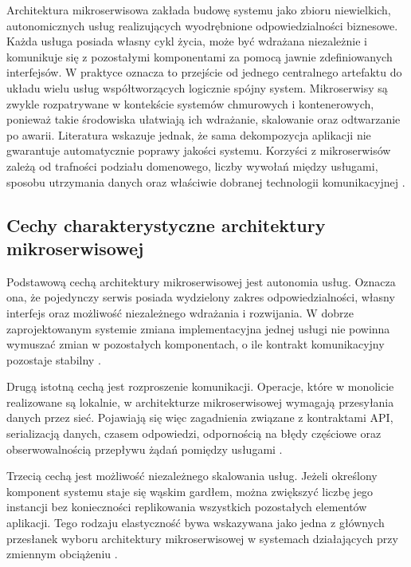 Architektura mikroserwisowa zakłada budowę systemu jako zbioru niewielkich, autonomicznych usług realizujących wyodrębnione odpowiedzialności biznesowe. Każda usługa posiada własny cykl życia, może być wdrażana niezależnie i komunikuje się z pozostałymi komponentami za pomocą jawnie zdefiniowanych interfejsów. W praktyce oznacza to przejście od jednego centralnego artefaktu do układu wielu usług współtworzących logicznie spójny system. Mikroserwisy są zwykle rozpatrywane w kontekście systemów chmurowych i kontenerowych, ponieważ takie środowiska ułatwiają ich wdrażanie, skalowanie oraz odtwarzanie po awarii. Literatura wskazuje jednak, że sama dekompozycja aplikacji nie gwarantuje automatycznie poprawy jakości systemu. Korzyści z mikroserwisów zależą od trafności podziału domenowego, liczby wywołań między usługami, sposobu utrzymania danych oraz właściwie dobranej technologii komunikacyjnej \cite{benavente2022comparative}.

\subsection{Cechy charakterystyczne architektury mikroserwisowej}
\label{subsec:microservices-characteristics}

Podstawową cechą architektury mikroserwisowej jest autonomia usług. Oznacza ona, że pojedynczy serwis posiada wydzielony zakres odpowiedzialności, własny interfejs oraz możliwość niezależnego wdrażania i rozwijania. W dobrze zaprojektowanym systemie zmiana implementacyjna jednej usługi nie powinna wymuszać zmian w pozostałych komponentach, o ile kontrakt komunikacyjny pozostaje stabilny \cite{rashmi2024synthetic}.

Drugą istotną cechą jest rozproszenie komunikacji. Operacje, które w monolicie realizowane są lokalnie, w architekturze mikroserwisowej wymagają przesyłania danych przez sieć. Pojawiają się więc zagadnienia związane z kontraktami API, serializacją danych, czasem odpowiedzi, odpornością na błędy częściowe oraz obserwowalnością przepływu żądań pomiędzy usługami \cite{bernsteiner2025performance}.

Trzecią cechą jest możliwość niezależnego skalowania usług. Jeżeli określony komponent systemu staje się wąskim gardłem, można zwiększyć liczbę jego instancji bez konieczności replikowania wszystkich pozostałych elementów aplikacji. Tego rodzaju elastyczność bywa wskazywana jako jedna z głównych przesłanek wyboru architektury mikroserwisowej w systemach działających przy zmiennym obciążeniu \cite{mangwani2022container}.

